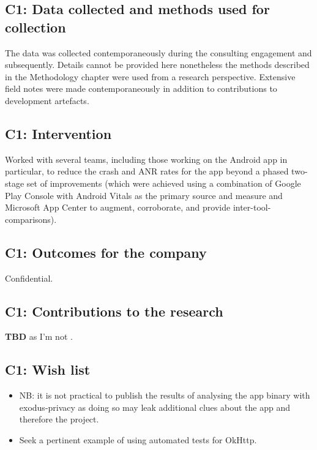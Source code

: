 \subsection{C1: Data collected and methods used for collection}
The data was collected contemporaneously during the consulting engagement and subsequently. Details cannot be provided here nonetheless the methods described in the Methodology chapter were used from a research perspective. Extensive field notes were made contemporaneously in addition to contributions to development artefacts. 

\subsection{C1: Intervention}
Worked with several teams, including those working on the Android app in particular, to reduce the crash and ANR rates for the app beyond a phased two-stage set of improvements (which were achieved using a combination of Google Play Console with Android Vitals as the primary source and measure and Microsoft App Center to augment, corroborate, and provide inter-tool-comparisons).

\subsection{C1: Outcomes for the company}
Confidential.

\subsection{C1: Contributions to the research}
\textbf{TBD} as I'm not .

\subsection*{C1: Wish list}
{\small

\begin{itemize}
    \item NB: it is not practical to publish the results of analysing the app binary with exodus-privacy as doing so may leak additional clues about the app and therefore the project.
    \item Seek a pertinent example of using automated tests for OkHttp.
\end{itemize}
}

\clearpage

